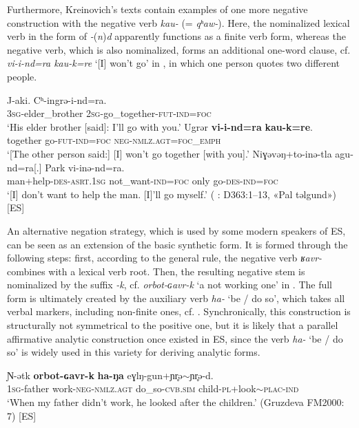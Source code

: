 \documentclass[output=paper,colorlinks,citecolor=brown]{langscibook}
\begin{document}
Furthermore, Kreinovich’s texts contain examples of one more negative construction with the negative verb \textit{kau{}-} (= \textit{qʰaw{}-}). Here, the nominalized lexical verb in the form of \textit{-}(\textit{n})\textit{d} apparently functions as a finite verb form, whereas the negative verb, which is also nominalized, forms an additional one-word clause, cf. \textit{vi-i-nd=ra kau-k=re} ‘[I] won’t go’ in , in which one person quotes two different people.

\ea\label{ex:niv:15}
    \gll  J-aki. Cʰ-ingrə{}-i-nd=ra. \\ 
         \textsc{3sg}{}-elder\_brother \textsc{2sg}{}-go\_together-\textsc{fut-ind=foc} \\ 
    \glt ‘His elder brother [said]: I’ll go with you.’ \medskip\newline
    \gll Ugrər \textbf{vi-i-nd=ra} \textbf{kau-k=re}.\\ 
        together go-\textsc{fut-ind=foc} \textsc{neg-nmlz.agt=foc\_emph} \\ 
    \glt ‘[The other person said:] [I] won’t go together [with you].’ \medskip\newline
    \gll  Niɣəvəŋ+to-inə{}-tla agu-nd=ra[.] Park vi-inə{}-nd=ra.\\ 
         man+help-\textsc{des-asrt.1sg} not\_want-\textsc{ind=foc} only go-\textsc{des-ind=foc}\\
    \glt  ‘[I] don’t want to help the man. [I]’ll go myself.’ (\citealt{KreinovichMs} : D363:1–13, «Pal təlgund») [ES]
\z 

An alternative negation strategy, which is used by some modern speakers of ES, can be seen as an extension of the basic synthetic form. It is formed through the following steps: first, according to the general rule, the negative verb \textit{ʁavr{}-} combines with a lexical verb root. Then, the resulting negative stem is nominalized by the suffix \textit{-k}, cf. \textit{orbot-ɢavr-k} ‘a not working one’ in . The full form is ultimately created by the auxiliary verb \textit{ha{}-} ‘be / do so’, which takes all verbal markers, including non-finite ones, cf. . Synchronically, this construction is structurally not symmetrical to the positive one, but it is likely that a parallel affirmative analytic construction once existed in ES, since the verb \textit{ha{}-} ‘be / do so’ is widely used in this variety for deriving analytic forms.

\ea\label{ex:niv:16}
    \gll Ɲ{}-ətk \textbf{orbot-ɢavr-k} \textbf{ha-ŋa} eɣlŋ-gun+ɲr̥ə${\sim}$ɲr̥ə{}-d. \\ 
         \textsc{1sg-}father work-\textsc{neg-nmlz.agt} do\_so-\textsc{cvb.sim} child-\textsc{pl}+look${\sim}$\textsc{plac}{}-\textsc{ind} \\
    \glt ‘When my father didn’t work, he looked after the children.’ (Gruzdeva FM2000: 7) [ES]
\z 
\end{document}
